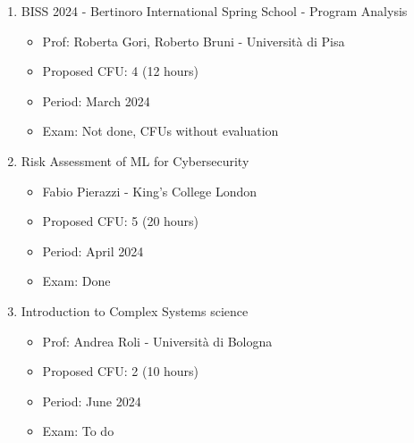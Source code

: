\documentclass[runningheads]{llncs}
\begin{document}
\begin{enumerate}
    \item BISS 2024 - Bertinoro International Spring School - Program Analysis
    \begin{itemize}
        \item Prof: Roberta Gori, Roberto Bruni  - Università di Pisa
        \item Proposed CFU: 4 (12 hours) 
        \item Period: March 2024
        \item Exam: Not done, CFUs without evaluation
    \end{itemize}    
    \item  Risk Assessment of ML for Cybersecurity
    \begin{itemize}
        \item Fabio Pierazzi - King's College London
        \item Proposed CFU: 5 (20 hours) 
        \item Period: April 2024
        \item Exam: Done
    \end{itemize}    
    \item Introduction to Complex Systems science   
    \begin{itemize}
        \item Prof: Andrea Roli - Università di Bologna      
        \item Proposed CFU: 2 (10 hours) 
        \item Period: June 2024
        \item Exam: To do
    \end{itemize}    
    
\end{enumerate}
%
%
%


%




\end{document}
